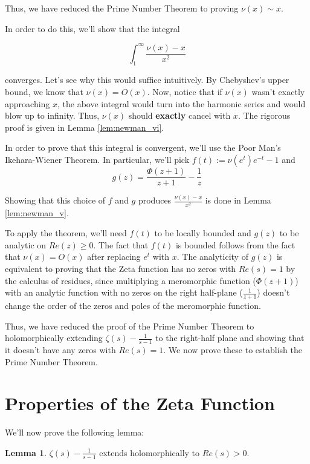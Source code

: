 \documentclass{article}
\theoremstyle{definition}
\newtheorem{lemma}[theorem]{Lemma}
\begin{document}
Thus, we have reduced the Prime Number Theorem to proving $ \nu(x) \sim x $.

In order to do this, we'll show that the integral 

\[ \int_{1}^{\infty} \frac{\nu(x) - x}{x^{2}} \]

converges. Let's see why this would suffice intuitively. By Chebyshev's upper bound,
we know that $ \nu(x) = O(x) $. Now, notice that if $ \nu(x) $ wasn't exactly approaching $ x $,
the above integral would turn into the harmonic series and would blow up to infinity. Thus, $ \nu(x) $ should 
\textbf{exactly} cancel with $ x $. The rigorous proof is given in Lemma \ref{lem:newman_vi}.

In order to prove that this integral is convergent, we'll use the Poor Man's Ikehara-Wiener Theorem.
In particular, we'll pick $ f(t) := \nu(e^{t}) e^{-t} -1 $ and 
\[ g(z) = \frac{\Phi(z+1)}{z+1} - \frac{1}{z} \]

Showing that this choice of $ f $ and $ g $ produces $ \frac{\nu(x) - x}{x^{2}} $
is done in Lemma \ref{lem:newman_v}.

To apply the theorem, we'll need $ f(t) $ to be locally bounded 
and $ g(z) $ to be analytic on $ Re(z) \geq 0 $.
The fact that $ f(t) $ is bounded follows from the fact that $ \nu(x) = O(x) $ after replacing $ e^{t} $ with $ x $. 
The analyticity of $ g(z) $ is equivalent to proving
that the Zeta function has no zeros with $ Re(s) = 1 $ by the calculus of residues,
since multiplying a meromorphic function ($ \Phi(z + 1) $) with an 
analytic function with no zeros on the right half-plane ($ \frac{1}{z + 1} $) doesn't change the order of 
the zeros and poles of the meromorphic function.

Thus, we have reduced the proof of the Prime Number Theorem to holomorphically
extending $ \zeta(s) - \frac{1}{s - 1} $ to the right-half plane and showing that it doesn't
have any zeros with $ Re(s) = 1 $. We now prove these to establish the Prime Number Theorem.

\section{Properties of the Zeta Function}

We'll now prove the following lemma:

\begin{lemma}
    $ \zeta(s) - \frac{1}{s - 1} $ extends holomorphically to $ Re(s) > 0 $.
\end{lemma}
\end{document}
